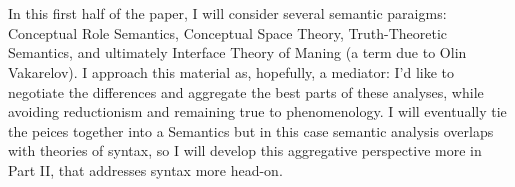 \part{}
In this first half of the paper, I will consider 
several semantic paraigms: Conceptual Role Semantics, 
Conceptual Space Theory, Truth-Theoretic Semantics, 
and ultimately Interface Theory of Maning (a term due to 
Olin Vakarelov).  I approach this 
material as, hopefully, a mediator: I'd like to 
negotiate the differences and aggregate the 
best parts of these analyses, while avoiding 
reductionism and remaining true to phenomenology.  
I will eventually tie the peices together into 
a  Semantics \mdash{} but in this 
case semantic analysis overlaps with theories of 
syntax, so I will develop this aggregative perspective more 
in Part II, that addresses syntax more head-on.
